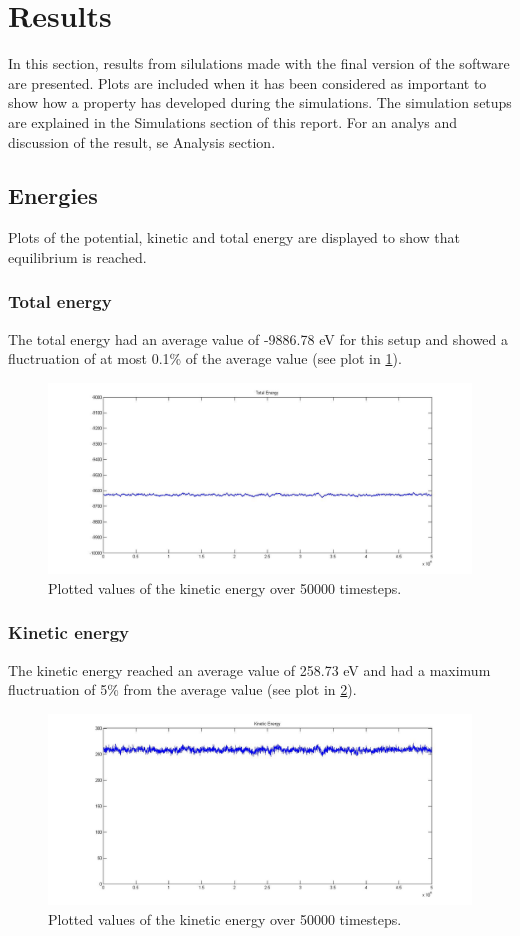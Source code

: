\section{Results}
In this section, results from silulations made with the final version of the software are presented. Plots are included when it has been considered as important to show how a property has developed during the simulations. The simulation setups are explained in the Simulations section of this report. For an analys and discussion of the result, se Analysis section.
\subsection{Energies}
Plots of the potential, kinetic and total energy are displayed to show that equilibrium is reached. 
\subsubsection{Total energy}
The total energy had an average value of -9886.78 eV for this setup and showed a fluctruation of at most 0.1\% of the average value (see plot in \ref{totale}).
\begin{figure}[h]
	\centering
	\includegraphics[width=1\textwidth]{Images/total1.jpg}
	\caption{Plotted values of the kinetic energy over 50000 timesteps.}
	\label{totale}
\end{figure}

\subsubsection{Kinetic energy}
The kinetic energy reached an average value of 258.73 eV and had a maximum fluctruation of 5\% from the average value (see plot in \ref{kinetic}).
\begin{figure}[h]
	\centering
	\includegraphics[width=1\textwidth]{Images/kinetic.jpg}
	\caption{Plotted values of the kinetic energy over 50000 timesteps.}
	\label{kinetic}
\end{figure}

